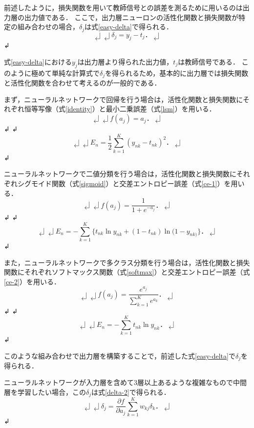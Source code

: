 前述したように，損失関数を用いて教師信号との誤差を測るために用いるのは出力層の出力値である．
ここで，出力層ニューロンの活性化関数と損失関数が特定の組み合わせの場合，$\delta_j$は式\ref{easy-delta}で得られる．
\begin{equation}↲
\label{easy-delta}↲
\delta_j = y_j - t_j．↲
\end{equation}↲

式\ref{easy-delta}における$y_j$は出力層より得られた出力値，$t_j$は教師信号である．
このように極めて単純な計算式で$\delta_j$を得られるため，基本的に出力層では損失関数と活性化関数を合わせて考えるのが一般的である．

まず，ニューラルネットワークで回帰を行う場合は，活性化関数と損失関数にそれぞれ恒等写像（式\ref{identity}）と最小二乗誤差（式\ref{lsm}）を用いる．
\begin{equation}↲
\label{identity}↲
f(a_j) = a_j．↲
\end{equation}↲
↲
\begin{equation}↲
\label{lsm}↲
E_n = \frac{1}{2} \sum_{k=1}^K (y_{nk} - t_{nk})^2．↲
\end{equation}↲

ニューラルネットワークで二値分類を行う場合は，活性化関数と損失関数にそれぞれシグモイド関数（式\ref{sigmoid}）と交差エントロピー誤差（式\ref{ce-1}）を用いる．
\begin{equation}↲
\label{sigmoid}↲
f(a_j) = \frac{1}{1 + e^{-a_j}}．↲
\end{equation}↲
↲
\begin{equation}↲
\label{ce-1}↲
E_n = - \sum_{k=1}^K \{t_{nk} \ln y_{nk} + (1 - t_{nk}) \ln (1 - y_{nk)}\}．↲
\end{equation}↲

また，ニューラルネットワークで多クラス分類を行う場合は，活性化関数と損失関数にそれぞれソフトマックス関数（式\ref{softmax}）と交差エントロピー誤差（式\ref{ce-2}）を用いる．
\begin{equation}↲
\label{softmax}↲
f(a_j) = \frac{e^{a_j}}{\sum_{k=1}^K e^{a_k}}．↲
\end{equation}↲
↲
\begin{equation}↲
\label{ce-2}↲
E_n = - \sum_{k=1}^K t_{nk} \ln y_{nk}．↲
\end{equation}↲

このような組み合わせで出力層を構築することで，前述した式\ref{easy-delta}で$\delta_j$を得られる．

ニューラルネットワークが入力層を含めて3層以上あるような複雑なもので中間層を学習したい場合，この$\delta_j$は式\ref{delta-2}で得られる．
\begin{equation}↲
\label{delta-2}↲
\delta_j = \frac{\partial f}{\partial a_j} \sum_{k=1}^K w_{kj} \delta_k．↲
\end{equation}↲

